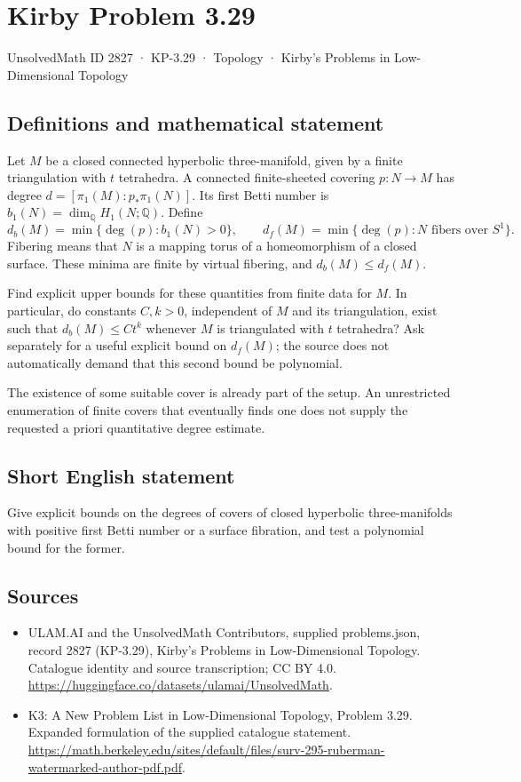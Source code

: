 \documentclass[11pt,a4paper]{article}
\begin{document}
\section*{Kirby Problem 3.29}\label{2827}
{\small UnsolvedMath ID 2827 · KP-3.29 · Topology · Kirby's Problems in Low-Dimensional Topology}
\subsection{Definitions and mathematical statement}
Let $M$ be a closed connected hyperbolic three-manifold, given by a finite
triangulation with $t$ tetrahedra. A connected finite-sheeted covering
$p:N\to M$ has degree $d=[\pi_1(M):p_*\pi_1(N)]$. Its first Betti number is
$b_1(N)=\dim_{\mathbb Q}H_1(N;\mathbb Q)$.
Define
\[
 d_b(M)=\min\{\deg(p):b_1(N)>0\},\qquad
 d_f(M)=\min\{\deg(p):N\text{ fibers over }S^1\}.
\]
Fibering means that $N$ is a mapping torus of a homeomorphism of a closed
surface. These minima are finite by virtual fibering, and
$d_b(M)\leq d_f(M)$.

Find explicit upper bounds for these quantities from finite data for $M$.
In particular, do constants $C,k>0$, independent of $M$ and its triangulation,
exist such that $d_b(M)\leq Ct^k$ whenever $M$ is triangulated with $t$
tetrahedra? Ask separately for a useful explicit bound on $d_f(M)$; the source
does not automatically demand that this second bound be polynomial.

The existence of some suitable cover is already part of the setup. An
unrestricted enumeration of finite covers that eventually finds one does not
supply the requested a priori quantitative degree estimate.
\subsection{Short English statement}
Give explicit bounds on the degrees of covers of closed hyperbolic three-manifolds with positive first Betti number or a surface fibration, and test a polynomial bound for the former.
\subsection{Sources}
\begin{itemize}
\item[S1] ULAM.AI and the UnsolvedMath Contributors, supplied problems.json, record 2827 (KP-3.29), Kirby's Problems in Low-Dimensional Topology. Catalogue identity and source transcription; CC BY 4.0.
\url{https://huggingface.co/datasets/ulamai/UnsolvedMath}.
\item[S2] K3: A New Problem List in Low-Dimensional Topology, Problem 3.29. Expanded formulation of the supplied catalogue statement.
\url{https://math.berkeley.edu/sites/default/files/surv-295-ruberman-watermarked-author-pdf.pdf}.
\end{itemize}
\end{document}
